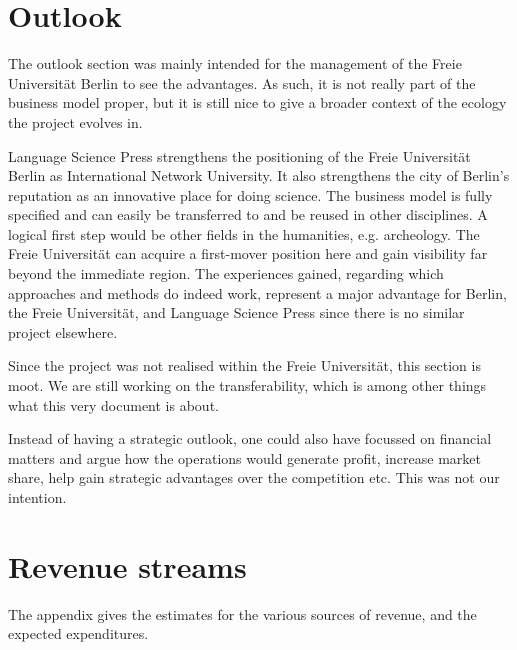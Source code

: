 \documentclass[nonflat,smallfont
]{langsci/langscibook}
\newcommand{\background}[1]{ 
  \vspace{5mm}
  \renewcommand{\tblslinecolour}{lsDarkBlue}
  \tblssy[red]{explore2}{Background}{\vspace*{-5mm}#1}
}
\newcommand{\langscisolution}[1]{
  \renewcommand{\tblslinecolour}{lsLightBlue}
  \tblssy{langsci}{LangSci solution}{\vspace*{-5mm}#1}
}
\newcommand{\evaluation}[1]{
  \renewcommand{\tblslinecolour}{lsLightOrange}
  \tblssy{receipt}{Evaluation}{\vspace*{-5mm}#1}
}
\newcommand{\othersolutions}[1]{
  \renewcommand{\tblslinecolour}{lsDarkGreenOne}
  \tblssy{more}{Other solutions}{\vspace*{-5mm}#1}
}
\renewcommand{\tblssy}[4][black!12]{%
  \renewcommand{\langscisymbol}{#2}\renewcommand{\tblsboxcolor}{#1}
  \begin{mdframed}[style=yellowexercise,frametitle={#3}]
    #4
  \end{mdframed}
}
\begin{document}
\chapter{Outlook}

\background{The outlook section was mainly intended for the management of the Freie Universität Berlin to see the advantages. As such, it is not really part of the business model proper, but it is still nice to give a broader context of the ecology the project evolves in.}
\langscisolution{
Language Science Press strengthens the positioning of the Freie Universität Berlin as International Network University. It also strengthens the city of Berlin's reputation as an innovative place for doing science. The business model is fully specified and can easily be transferred to and be reused in other disciplines. A logical first step would be other fields in the humanities, e.g. archeology. The Freie Universität can acquire a first-mover position here and gain visibility far beyond the immediate region. The experiences gained, regarding which approaches and methods do indeed work, represent a major advantage for Berlin, the Freie Universität, and Language Science Press since there is no similar project elsewhere. 
}
\evaluation{Since the project was not realised within the Freie Universität, this section is moot. We are still working on the transferability, which is among other things what this very document is about.}
\othersolutions{
Instead of having a strategic outlook, one could also have focussed on financial matters and argue how the operations would generate profit, increase market share, help gain strategic advantages over the competition etc. This was not our intention. 
}
  

\appendix
\chapter{Revenue streams}\label{app:revenuestreams}
The appendix gives the estimates for the various sources of revenue, and the expected expenditures.
\end{document}
